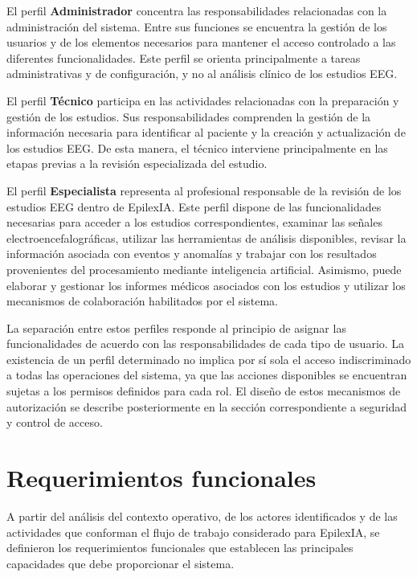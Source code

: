 El perfil \textbf{Administrador} concentra las responsabilidades relacionadas
con la administración del sistema. Entre sus funciones se encuentra la gestión
de los usuarios y de los elementos necesarios para mantener el acceso
controlado a las diferentes funcionalidades. Este perfil se orienta
principalmente a tareas administrativas y de configuración, y no al análisis
clínico de los estudios EEG.

El perfil \textbf{Técnico} participa en las actividades relacionadas con la
preparación y gestión de los estudios. Sus responsabilidades comprenden la
gestión de la información necesaria para identificar al paciente y la creación
y actualización de los estudios EEG. De esta manera, el técnico interviene
principalmente en las etapas previas a la revisión especializada del estudio.

El perfil \textbf{Especialista} representa al profesional responsable de la
revisión de los estudios EEG dentro de EpilexIA. Este perfil dispone de las
funcionalidades necesarias para acceder a los estudios correspondientes,
examinar las señales electroencefalográficas, utilizar las herramientas de
análisis disponibles, revisar la información asociada con eventos y anomalías
y trabajar con los resultados provenientes del procesamiento mediante
inteligencia artificial. Asimismo, puede elaborar y gestionar los informes
médicos asociados con los estudios y utilizar los mecanismos de colaboración
habilitados por el sistema.

La separación entre estos perfiles responde al principio de asignar las
funcionalidades de acuerdo con las responsabilidades de cada tipo de usuario.
La existencia de un perfil determinado no implica por sí sola el acceso
indiscriminado a todas las operaciones del sistema, ya que las acciones
disponibles se encuentran sujetas a los permisos definidos para cada rol. El
diseño de estos mecanismos de autorización se describe posteriormente en la
sección correspondiente a seguridad y control de acceso.


\section{Requerimientos funcionales}
\label{sec:requerimientos-funcionales}

A partir del análisis del contexto operativo, de los actores identificados y
de las actividades que conforman el flujo de trabajo considerado para
EpilexIA, se definieron los requerimientos funcionales que establecen las
principales capacidades que debe proporcionar el sistema.

